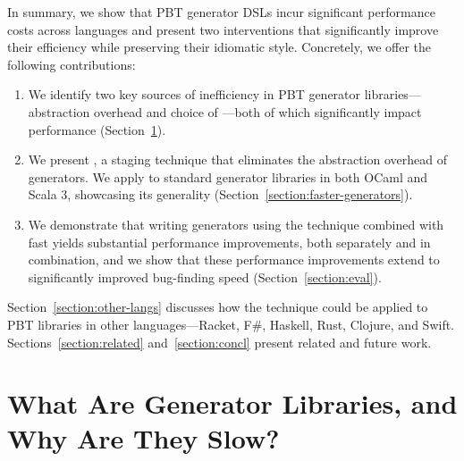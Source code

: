 \documentclass[acmsmall]{acmart}
\theoremstyle{definition}
\begin{document}
In summary, we show that PBT generator DSLs incur significant
performance costs across languages and present two interventions that
significantly improve their efficiency while preserving their
idiomatic style.  Concretely, we offer the following contributions:
\begin{enumerate}
\item We identify two key sources of inefficiency in PBT generator
libraries---abstraction overhead and choice of \rand---both of which
significantly impact performance (Section~\ref{section:motiv}).
\item We present \name{}, a staging technique that eliminates the
abstraction overhead of generators. We apply \name{} to standard
generator libraries in both OCaml and Scala 3, showcasing its
generality (Section~\ref{section:faster-generators}).
\item We demonstrate that writing generators using the \name{} technique combined with fast
\rands{} yields substantial performance improvements, both separately
and in combination, and we show that these performance improvements
extend to significantly improved bug-finding speed (Section~\ref{section:eval}).
\end{enumerate}

Section~\ref{section:other-langs} discusses how the \name{}
technique could be applied to PBT libraries in other
languages---Racket, F\#, Haskell, Rust, Clojure, and Swift.
%
Sections~\ref{section:related} and~\ref{section:concl} present related
and future work.

\section{What Are Generator Libraries, and Why Are They Slow?}
\label{section:motiv}

\end{document}
